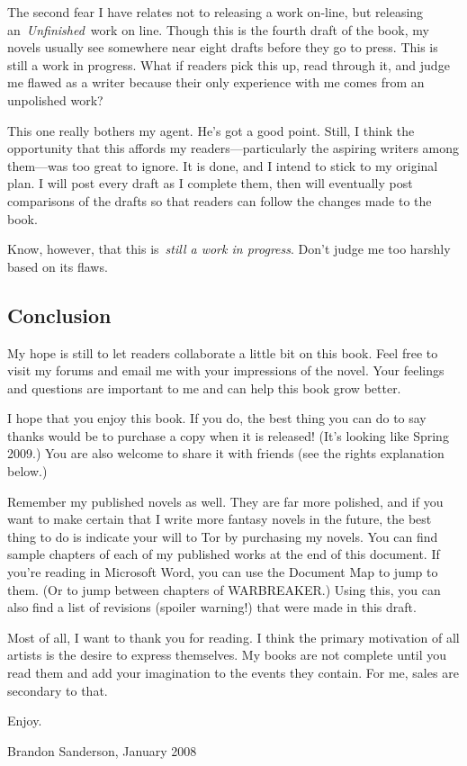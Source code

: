 The second fear I have relates not to releasing a work on-line, but releasing an~\textit{Unfinished}~work on line. Though this is the fourth draft of the book, my novels usually see somewhere near eight drafts before they go to press. This is still a work in progress. What if readers pick this up, read through it, and judge me flawed as a writer because their only experience with me comes from an unpolished work?

This one really bothers my agent. He’s got a good point. Still, I think the opportunity that this affords my readers—particularly the aspiring writers among them—was too great to ignore. It is done, and I intend to stick to my original plan. I will post every draft as I complete them, then will eventually post comparisons of the drafts so that readers can follow the changes made to the book.

Know, however, that this is~\textit{still a work in progress}. Don’t judge me too harshly based on its flaws.

\subsection*{Conclusion}

My hope is still to let readers collaborate a little bit on this book. Feel free to visit my forums and email me with your impressions of the novel. Your feelings and questions are important to me and can help this book grow better.

I hope that you enjoy this book. If you do, the best thing you can do to say thanks would be to purchase a copy when it is released! (It’s looking like Spring 2009.) You are also welcome to share it with friends (see the rights explanation below.)

Remember my published novels as well. They are far more polished, and if you want to make certain that I write more fantasy novels in the future, the best thing to do is indicate your will to Tor by purchasing my novels. You can find sample chapters of each of my published works at the end of this document. If you’re reading in Microsoft Word, you can use the Document Map to jump to them. (Or to jump between chapters of WARBREAKER.) Using this, you can also find a list of revisions (spoiler warning!) that were made in this draft.

Most of all, I want to thank you for reading. I think the primary motivation of all artists is the desire to express themselves. My books are not complete until you read them and add your imagination to the events they contain. For me, sales are secondary to that.

Enjoy.

\hfill Brandon Sanderson, January 2008

